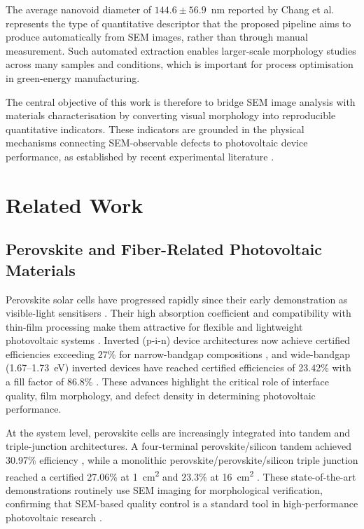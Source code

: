 \documentclass[pdflatex,sn-mathphys-num,iicol]{sn-jnl}
\theoremstyle{thmstyleone}
\theoremstyle{thmstyletwo}
\theoremstyle{thmstylethree}
\begin{document}
The average nanovoid diameter of $144.6 \pm 56.9$~nm reported by
Chang et al.\ \cite{chang2026} represents the type of quantitative
descriptor that the proposed pipeline aims to produce automatically
from SEM images, rather than through manual measurement. Such
automated extraction enables larger-scale morphology studies across
many samples and conditions, which is important for process
optimisation in green-energy manufacturing.

The central objective of this work is therefore to bridge SEM image
analysis with materials characterisation by converting visual
morphology into reproducible quantitative indicators. These
indicators are grounded in the physical mechanisms connecting
SEM-observable defects to photovoltaic device performance, as
established by recent experimental literature
\cite{chang2026,zheng2025,hu2023}.


\section{Related Work}\label{sec:related_work}

\subsection{Perovskite and Fiber-Related Photovoltaic Materials}
\label{subsec:psc_related_work}

Perovskite solar cells have progressed rapidly since their early
demonstration as visible-light sensitisers \cite{kojima2009}. Their
high absorption coefficient and compatibility with thin-film
processing make them attractive for flexible and lightweight
photovoltaic systems \cite{snaith2013,green2014,park2015}. Inverted
(p-i-n) device architectures now achieve certified efficiencies
exceeding 27\% for narrow-bandgap compositions \cite{green2025},
and wide-bandgap (1.67--1.73~eV) inverted devices have reached
certified efficiencies of 23.42\% with a fill factor of 86.8\%
\cite{chang2026}. These advances highlight the critical role of
interface quality, film morphology, and defect density in determining
photovoltaic performance.

At the system level, perovskite cells are increasingly integrated
into tandem and triple-junction architectures. A four-terminal
perovskite/silicon tandem achieved 30.97\% efficiency
\cite{chang2026}, while a monolithic perovskite/perovskite/silicon
triple junction reached a certified 27.06\% at 1~cm\textsuperscript{2}
and 23.3\% at 16~cm\textsuperscript{2} \cite{zheng2025}. These
state-of-the-art demonstrations routinely use SEM imaging for
morphological verification, confirming that SEM-based quality control
is a standard tool in high-performance photovoltaic research
\cite{chang2026,zheng2025}.
\end{document}

